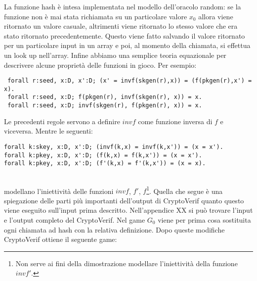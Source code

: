 \documentclass[a4paper,openright,twoside,12pt]{report}
\begin{document}
La funzione hash \`e intesa implementata nel modello dell'oracolo random: se la funzione non \`e mai stata richiamata su un particolare valore $x_0$ allora viene ritornato un valore casuale, 
altrimenti viene ritornato lo stesso valore che era stato ritornato precedentemente. Questo viene fatto salvando il valore ritornato per un particolare input in un array e poi,
al momento della chiamata, si effettua un look up nell'array.
Infine abbiamo una semplice teoria equazionale per descrivere alcune propriet\`a delle funzioni in gioco.\newpage
Per esempio:
\begin{verbatim}
 forall r:seed, x:D, x':D; (x' = invf(skgen(r),x)) = (f(pkgen(r),x') = x).
 forall r:seed, x:D; f(pkgen(r), invf(skgen(r), x)) = x.
 forall r:seed, x:D; invf(skgen(r), f(pkgen(r), x)) = x.
\end{verbatim}
Le precedenti regole servono a definire $invf$ come funzione inversa di $f$ e viceversa. Mentre le seguenti:
\begin{verbatim}
forall k:skey, x:D, x':D; (invf(k,x) = invf(k,x')) = (x = x').
forall k:pkey, x:D, x':D; (f(k,x) = f(k,x')) = (x = x').
forall k:pkey, x:D, x':D; (f'(k,x) = f'(k,x')) = (x = x).
\end{verbatim}\\
modellano l'iniettivit\`a delle funzioni $invf$, $f'$, $f$\footnote{Non serve ai fini della dimostrazione modellare l'iniettivit\`a della funzione $invf'$.}.
Quella che segue \`e una spiegazione delle parti pi\`u importanti dell'output di CryptoVerif quanto questo viene eseguito sull'input prima descritto.
Nell'appendice XX si pu\`o trovare l'input e l'output completo del CryptoVerif.
Nel game $G_0$ viene per prima cosa sostituita ogni chiamata ad hash con la relativa definizione.
Dopo queste modifiche CryptoVerif ottiene il seguente game:
\end{document}
